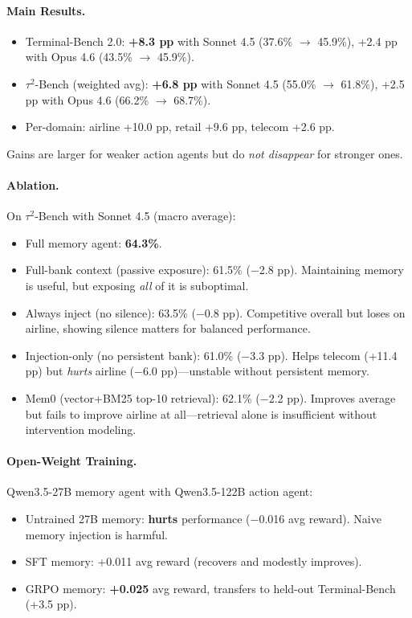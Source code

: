 \documentclass[11pt,a4paper]{article}
\begin{document}
\paragraph{Main Results.}
\begin{itemize}
\item Terminal-Bench 2.0: \textbf{+8.3 pp} with Sonnet 4.5 (37.6\% $\to$ 45.9\%), +2.4 pp with Opus 4.6 (43.5\% $\to$ 45.9\%).
\item $\tau^2$-Bench (weighted avg): \textbf{+6.8 pp} with Sonnet 4.5 (55.0\% $\to$ 61.8\%), +2.5 pp with Opus 4.6 (66.2\% $\to$ 68.7\%).
\item Per-domain: airline +10.0 pp, retail +9.6 pp, telecom +2.6 pp.
\end{itemize}
Gains are larger for weaker action agents but do \emph{not disappear} for stronger ones.

\paragraph{Ablation.} On $\tau^2$-Bench with Sonnet 4.5 (macro average):
\begin{itemize}
\item Full memory agent: \textbf{64.3\%}.
\item Full-bank context (passive exposure): 61.5\% ($-$2.8 pp). Maintaining memory is useful, but exposing \emph{all} of it is suboptimal.
\item Always inject (no silence): 63.5\% ($-$0.8 pp). Competitive overall but loses on airline, showing silence matters for balanced performance.
\item Injection-only (no persistent bank): 61.0\% ($-$3.3 pp). Helps telecom (+11.4 pp) but \emph{hurts} airline ($-$6.0 pp)---unstable without persistent memory.
\item Mem0 (vector+BM25 top-10 retrieval): 62.1\% ($-$2.2 pp). Improves average but fails to improve airline at all---retrieval alone is insufficient without intervention modeling.
\end{itemize}

\paragraph{Open-Weight Training.} Qwen3.5-27B memory agent with Qwen3.5-122B action agent:
\begin{itemize}
\item Untrained 27B memory: \textbf{hurts} performance ($-$0.016 avg reward). Naive memory injection is harmful.
\item SFT memory: +0.011 avg reward (recovers and modestly improves).
\item GRPO memory: \textbf{+0.025} avg reward, transfers to held-out Terminal-Bench (+3.5 pp).
\end{itemize}
\end{document}
